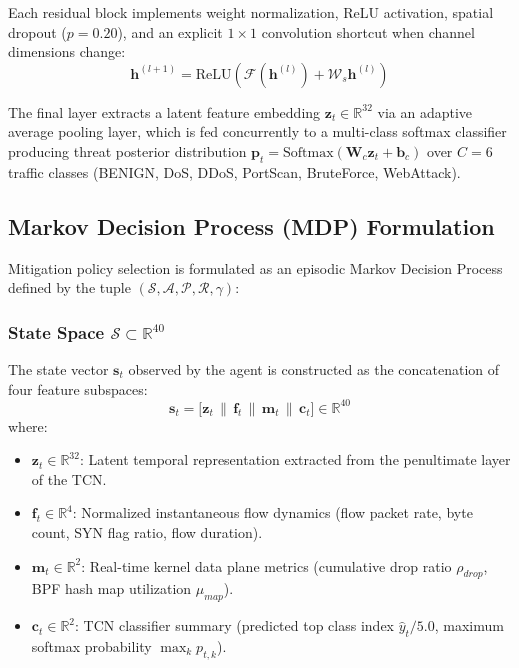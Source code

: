 \documentclass[conference,10pt]{IEEEtran}
\begin{document}
Each residual block implements weight normalization, ReLU activation, spatial dropout ($p=0.20$), and an explicit $1\times 1$ convolution shortcut when channel dimensions change:
\begin{equation}
\mathbf{h}^{(l+1)} = \text{ReLU}\left( \mathcal{F}(\mathbf{h}^{(l)}) + \mathcal{W}_s \mathbf{h}^{(l)} \right)
\end{equation}

The final layer extracts a latent feature embedding $\mathbf{z}_t \in \mathbb{R}^{32}$ via an adaptive average pooling layer, which is fed concurrently to a multi-class softmax classifier producing threat posterior distribution $\mathbf{p}_t = \text{Softmax}(\mathbf{W}_c \mathbf{z}_t + \mathbf{b}_c)$ over $C=6$ traffic classes (BENIGN, DoS, DDoS, PortScan, BruteForce, WebAttack).

\subsection{Markov Decision Process (MDP) Formulation}
Mitigation policy selection is formulated as an episodic Markov Decision Process defined by the tuple $(\mathcal{S}, \mathcal{A}, \mathcal{P}, \mathcal{R}, \gamma)$:

\subsubsection{State Space $\mathcal{S} \subset \mathbb{R}^{40}$}
The state vector $\mathbf{s}_t$ observed by the agent is constructed as the concatenation of four feature subspaces:
\begin{equation}
\mathbf{s}_t = \big[ \mathbf{z}_t \,\|\, \mathbf{f}_t \,\|\, \mathbf{m}_t \,\|\, \mathbf{c}_t \big] \in \mathbb{R}^{40}
\end{equation}
where:
\begin{itemize}
    \item $\mathbf{z}_t \in \mathbb{R}^{32}$: Latent temporal representation extracted from the penultimate layer of the TCN.
    \item $\mathbf{f}_t \in \mathbb{R}^{4}$: Normalized instantaneous flow dynamics (flow packet rate, byte count, SYN flag ratio, flow duration).
    \item $\mathbf{m}_t \in \mathbb{R}^{2}$: Real-time kernel data plane metrics (cumulative drop ratio $\rho_{drop}$, BPF hash map utilization $\mu_{map}$).
    \item $\mathbf{c}_t \in \mathbb{R}^{2}$: TCN classifier summary (predicted top class index $\hat{y}_t / 5.0$, maximum softmax probability $\max_k p_{t,k}$).
\end{itemize}
\end{document}
